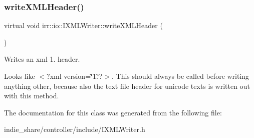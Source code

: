 \subsubsection{\texorpdfstring{write\+X\+M\+L\+Header()}{writeXMLHeader()}\hspace{0.1cm}{\footnotesize\ttfamily [2/2]}}
{\footnotesize\ttfamily virtual void irr\+::io\+::\+I\+X\+M\+L\+Writer\+::write\+X\+M\+L\+Header (\begin{DoxyParamCaption}{ }\end{DoxyParamCaption})\hspace{0.3cm}{\ttfamily [pure virtual]}}



Writes an xml 1. header. 

Looks like $<$?xml version=\char`\"{}1.\char`\"{}?$>$. This should always be called before writing anything other, because also the text file header for unicode texts is written out with this method. 

The documentation for this class was generated from the following file\+:\begin{DoxyCompactItemize}
\item 
indie\+\_\+share/controller/include/I\+X\+M\+L\+Writer.\+h\end{DoxyCompactItemize}
